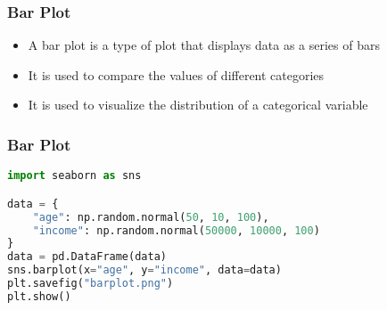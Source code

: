 \documentclass[serif, 9pt, aspectratio=32]{beamer}
\begin{document}
\begin{frame}
    \centering
    \frametitle{Bar Plot}
    \begin{itemize}
        \setlength{\itemsep}{2em}
        \item A bar plot is a type of plot that displays data as a series of bars
        \item It is used to compare the values of different categories
        \item It is used to visualize the distribution of a categorical variable
    \end{itemize}
\end{frame}

\begin{frame}[fragile]
    \frametitle{Bar Plot}
    \begin{lstlisting}[language=Python]
import seaborn as sns

data = {
    "age": np.random.normal(50, 10, 100),
    "income": np.random.normal(50000, 10000, 100)
}
data = pd.DataFrame(data)
sns.barplot(x="age", y="income", data=data)
plt.savefig("barplot.png")
plt.show()
    \end{lstlisting}
\end{frame}
\end{document}

